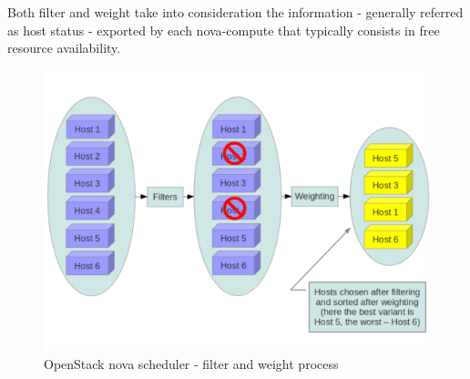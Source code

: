 Both filter and weight take into consideration the information - generally referred as host status - exported by each nova-compute that typically consists in free resource availability.
\begin{figure}[H]
	\centering
	\includegraphics[clip= true, width= \columnwidth]{images/nova-filter-weight.png}
	\caption{OpenStack nova scheduler - filter and weight process}
	\label{fig:OSnovascheduler}
\end{figure}
